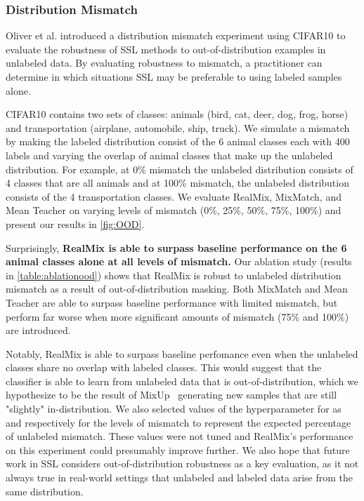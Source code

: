 \documentclass[10pt,twocolumn,letterpaper]{article}
\begin{document}
\subsubsection{Distribution Mismatch}
\label{experiments:ood}
Oliver et al.\cite{realisticevalOliver} introduced a distribution mismatch experiment using CIFAR10 to evaluate the robustness of SSL methods to out-of-distribution examples in unlabeled data. By evaluating robustness to mismatch, a practitioner can determine in which situations SSL may be preferable to using labeled samples alone.

CIFAR10 contains two sets of classes: animals (bird, cat, deer, dog, frog, horse) and transportation (airplane, automobile, ship, truck). We simulate a mismatch by making the labeled distribution consist of the 6 animal classes each with 400 labels and varying the overlap of animal classes that make up the unlabeled distribution. For example, at 0\% mismatch the unlabeled distribution consists of 4 classes that are all animals and at 100\% mismatch, the unlabeled distribution consists of the 4 transportation classes. We evaluate RealMix, MixMatch, and Mean Teacher on varying levels of mismatch (0\%, 25\%, 50\%, 75\%, 100\%) and present our results in \cref{fig:OOD}. 

Surprisingly, \textbf{RealMix is able to surpass baseline performance on the 6 animal classes alone at all levels of mismatch.} Our ablation study (results in \cref{table:ablationood}) shows that RealMix is robust to unlabeled distribution mismatch as a result of out-of-distribution masking. Both MixMatch and Mean Teacher are able to surpass baseline performance with limited mismatch, but perform far worse when more significant amounts of mismatch (75\% and 100\%) are introduced.

Notably, RealMix is able to surpass baseline perfomance even when the unlabeled classes share no overlap with labeled classes. This would suggest that the classifier is able to learn from unlabeled data that is out-of-distribution, which we hypothesize to be the result of MixUp~\cite{mixupZhang} generating new samples that are still "slightly" in-distribution. We also selected values of the hyperparameter  for  as  and  respectively for the levels of mismatch to represent the expected percentage of unlabeled mismatch. These  values were not tuned and RealMix's performance on this experiment could presumably improve further. We also hope that future work in SSL considers out-of-distribution robustness as a key evaluation, as it not always true in real-world settings that unlabeled and labeled data arise from the same distribution.
\end{document}

